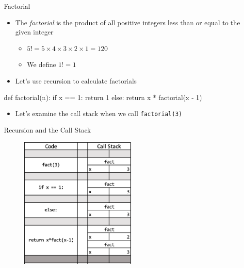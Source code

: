 \documentclass[
  ignorenonframetext,
]{beamer}
\newenvironment{Shaded}{\begin{snugshade}}{\end{snugshade}}
\newcommand{\ControlFlowTok}[1]{\textcolor[rgb]{0.00,0.23,0.31}{#1}}
\newcommand{\DecValTok}[1]{\textcolor[rgb]{0.68,0.00,0.00}{#1}}
\newcommand{\KeywordTok}[1]{\textcolor[rgb]{0.00,0.23,0.31}{#1}}
\newcommand{\NormalTok}[1]{\textcolor[rgb]{0.00,0.23,0.31}{#1}}
\newcommand{\OperatorTok}[1]{\textcolor[rgb]{0.37,0.37,0.37}{#1}}
\providecommand{\tightlist}{%
  \setlength{\itemsep}{0pt}\setlength{\parskip}{0pt}}\usepackage{longtable,booktabs,array}
\begin{document}
\begin{frame}[fragile]{Factorial}
\protect\hypertarget{factorial}{}
\begin{itemize}
\item
  The \emph{factorial} is the product of all positive integers less than
  or equal to the given integer

  \begin{itemize}
  \item
    \(5! = 5 \times 4 \times 3 \times 2 \times 1 = 120\)
  \item
    We define \(1! = 1\)
  \end{itemize}
\item
  Let's use recursion to calculate factorials
\end{itemize}

\begin{Shaded}
\begin{Highlighting}[]
\KeywordTok{def}\NormalTok{ factorial(n):}
  \ControlFlowTok{if}\NormalTok{ x }\OperatorTok{==} \DecValTok{1}\NormalTok{:}
    \ControlFlowTok{return} \DecValTok{1}
  \ControlFlowTok{else}\NormalTok{:}
    \ControlFlowTok{return}\NormalTok{ x }\OperatorTok{*}\NormalTok{ factorial(x }\OperatorTok{{-}} \DecValTok{1}\NormalTok{)}
\end{Highlighting}
\end{Shaded}

\begin{itemize}
\tightlist
\item
  Let's examine the call stack when we call \texttt{factorial(3)}
\end{itemize}
\end{frame}

\begin{frame}{Recursion and the Call Stack}
\protect\hypertarget{recursion-and-the-call-stack}{}
\begin{figure}

{\centering \includegraphics[width=5.9cm,height=\textheight]{images/rec-call-1.png}

}

\end{figure}
\end{frame}
\end{document}
